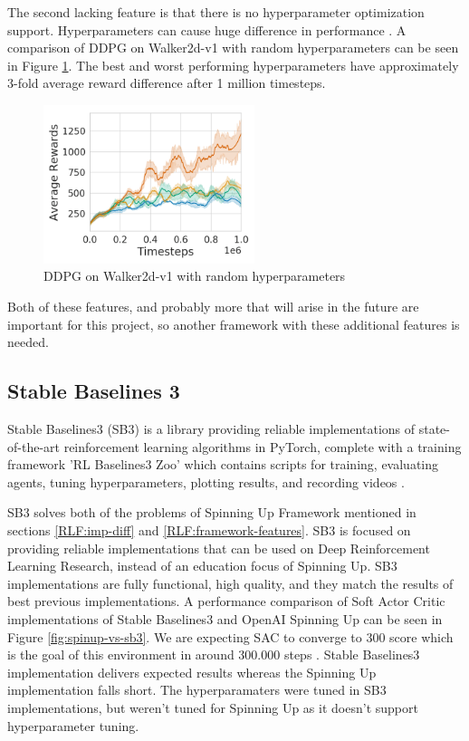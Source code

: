 \documentclass[12pt,twoside]{report}
\begin{document}
The second lacking feature is that there is no hyperparameter optimization support. Hyperparameters can cause huge difference in performance \cite{hyperparameter-ddpg}. A comparison of DDPG on Walker2d-v1 with random hyperparameters can be seen in Figure \ref{fig:hyperparameter-ddpg}. The best and worst performing hyperparameters have approximately 3-fold average reward difference after 1 million timesteps.

\begin{figure}[h]
\centering
\includegraphics[width = 0.55\textwidth]{figures/rl-framework/hyperparameter-ddpg.png}
\caption{DDPG on Walker2d-v1 with random hyperparameters \cite{hyperparameter-ddpg}}
\label{fig:hyperparameter-ddpg}
\end{figure}

Both of these features, and probably more that will arise in the future are important for this project, so another framework with these additional features is needed.


\subsection{Stable Baselines 3}
Stable Baselines3 (SB3) is a library providing reliable implementations of state-of-the-art reinforcement learning algorithms in PyTorch, complete with a training framework 'RL Baselines3 Zoo' which contains scripts for training, evaluating agents, tuning hyperparameters, plotting results, and recording videos \cite{stable-baselines3}.

SB3 solves both of the problems of Spinning Up Framework mentioned in sections \ref{RLF:imp-diff} and \ref{RLF:framework-features}. SB3 is focused on providing reliable implementations that can be used on Deep Reinforcement Learning Research, instead of an education focus of Spinning Up. SB3 implementations are fully functional, high quality, and they match the results of best previous implementations. A performance comparison of Soft Actor Critic implementations of Stable Baselines3 and OpenAI Spinning Up can be seen in Figure \ref{fig:spinup-vs-sb3}. We are expecting SAC to converge to 300 score which is the goal of this environment \cite{Bipedal-Walker-v2} in around 300.000 steps \cite{gym-leaderboard}. Stable Baselines3 implementation delivers expected results whereas the Spinning Up implementation falls short. The hyperparamaters were tuned in SB3 implementations, but weren't tuned for Spinning Up as it doesn't support hyperparameter tuning.
\end{document}
